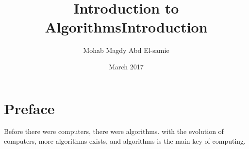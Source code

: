 \documentclass[a4paper,12pt]{book}
\begin{document}
\author{Mohab Magdy Abd El-samie}
\title{Introduction to Algorithms}
\date{March 2017}

\frontmatter
\maketitle
\title{\textbf{Introduction}}
\chapter*{Preface}
Before there were computers, there were  algorithms. with the evolution of computers, more algorithms exists, and algorithms is the main key of computing.
\tableofcontents
\mainmatter



\backmatter
\end{document}
